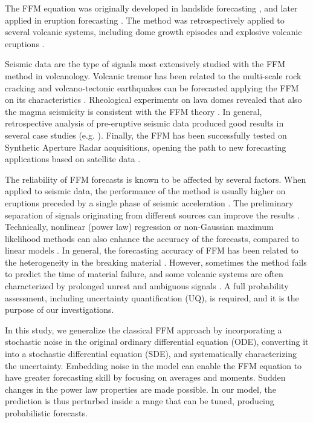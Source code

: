 \documentclass{article}
\begin{document}
The FFM equation was originally developed in landslide forecasting \citep{Fukuzuno1985, Voight1987, Voight1988b, Voight1989b}, and later applied in eruption forecasting \citep{Voight1988, Voight1989, Cornelius1995}. The method was retrospectively applied to several volcanic systems, including dome growth episodes and explosive volcanic eruptions \citep{Voight1991, Cornelius1994, Cornelius1996, Voight2000}.

Seismic data are the type of signals most extensively studied with the FFM method in volcanology. Volcanic tremor has been related to the multi-scale rock cracking \citep{Kilburn1998,Ortiz2003,Kilburn2003,Smith2009} and volcano-tectonic earthquakes can be forecasted applying the FFM on its characteristics \citep{Tarraga2006}. Rheological experiments on lava domes revealed that also the magma seismicity is consistent with the FFM theory \citep{Lavallee2008}. In general, retrospective analysis of pre-eruptive seismic data produced good results in several case studies (e.g. \cite{Smith2010, Budi2013, Chardot2013}). Finally, the FFM has been successfully tested on Synthetic Aperture Radar acquisitions, opening the path to new forecasting applications based on satellite data \citep{Moretto2016}.

The reliability of FFM forecasts is known to be affected by several factors. When applied to seismic data, the performance of the method is usually higher on eruptions preceded by a single phase of seismic acceleration \citep{Boue2015}. The preliminary separation of signals originating from different sources can improve the results \citep{Salvage2016, Salvage2017}. Technically, nonlinear (power law) regression or non-Gaussian maximum likelihood methods can also enhance the accuracy of the forecasts, compared to linear models \citep{Bell2011, Bell2013}. In general, the forecasting accuracy of FFM has been related to the heterogeneity in the breaking material \citep{Vasseur2015}. However, sometimes the method fails to predict the time of material failure, and some volcanic systems are often characterized by prolonged unrest and ambiguous signals \citep{Chiodini2016}. A full probability assessment, including uncertainty quantification (UQ), is required, and it is the purpose of our investigations.

In this study, we generalize the classical FFM approach by incorporating a stochastic noise in the original ordinary differential equation (ODE), converting it into a stochastic differential equation (SDE), and systematically characterizing the uncertainty. Embedding noise in the model can enable the FFM equation to have greater forecasting skill by focusing on averages and moments. Sudden changes in the power law properties are made possible. In our model, the prediction is thus perturbed inside a range that can be tuned, producing probabilistic forecasts.
\end{document}

